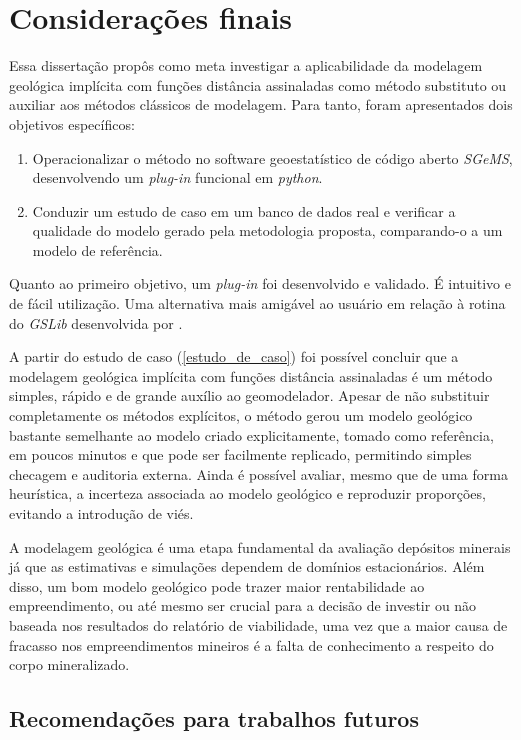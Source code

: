 \chapter{Considerações finais}

Essa dissertação propôs como meta investigar a aplicabilidade da modelagem geológica implícita com funções distância assinaladas como método substituto ou auxiliar aos métodos clássicos de modelagem. Para tanto, foram apresentados dois objetivos específicos:

\begin{enumerate}
\item Operacionalizar o método no software geoestatístico de código aberto \textit{SGeMS},
desenvolvendo um \textit{plug-in} funcional em \textit{python}.
\item Conduzir um estudo de caso em um banco de dados real e verificar a qualidade do
modelo gerado pela metodologia proposta, comparando-o a um modelo de referência.
\end{enumerate}

Quanto ao primeiro objetivo, um \textit{plug-in} foi desenvolvido e validado. É intuitivo e de fácil utilização. Uma alternativa mais amigável ao usuário em relação à rotina do \textit{GSLib} desenvolvida por .

A partir do estudo de caso (\autoref{estudo_de_caso}) foi possível concluir que a modelagem geológica implícita com funções distância assinaladas é um método simples, rápido e de grande auxílio ao geomodelador. Apesar de não substituir completamente os métodos explícitos, o método gerou um modelo geológico bastante semelhante ao modelo criado explicitamente, tomado como referência, em poucos minutos e que pode ser facilmente replicado, permitindo simples checagem e auditoria externa. Ainda é possível avaliar, mesmo que de uma forma heurística, a incerteza associada ao modelo geológico e reproduzir proporções, evitando a introdução de viés.

A modelagem geológica é uma etapa fundamental da avaliação depósitos minerais já que as estimativas e simulações dependem de domínios estacionários. Além disso, um bom modelo geológico pode trazer maior rentabilidade ao empreendimento, ou até mesmo ser crucial para a decisão de investir ou não baseada nos resultados do relatório de viabilidade, uma vez que a maior causa de fracasso nos empreendimentos mineiros é a falta de conhecimento a respeito do corpo mineralizado.

\section{Recomendações para trabalhos futuros}

